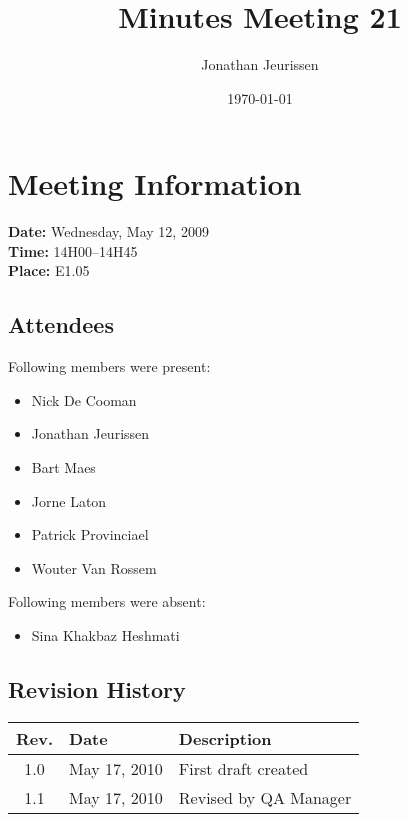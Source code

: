 \documentclass[a4paper, 12pt]{article}
\begin{document}
\title{Minutes Meeting 21}
\author{Jonathan Jeurissen}
\date{\today}

\maketitle	
	\section{Meeting Information}
		\textbf{Date:} Wednesday, May 12, 2009\\
		\textbf{Time:} 14H00--14H45\\
		\textbf{Place:} E1.05\\
		\subsection{Attendees}
Following members were present:
			\begin{itemize}
				\item Nick De Cooman
				\item Jonathan Jeurissen
				\item Bart Maes
				\item Jorne Laton
				\item Patrick Provinciael
				\item Wouter Van Rossem
				
			\end{itemize}

Following members were absent:
			\begin{itemize}
				\item Sina Khakbaz Heshmati
			\end{itemize}
			
		\subsection{Revision History}
			\begin{tabular}{c | l | l }
				\textbf{Rev.} & \textbf{Date} & \textbf{Description} \\
				\hline
				1.0 & May 17, 2010 & First draft created \\
				1.1 & May 17, 2010 & Revised by QA Manager \\
			\end{tabular}		
\end{document}
